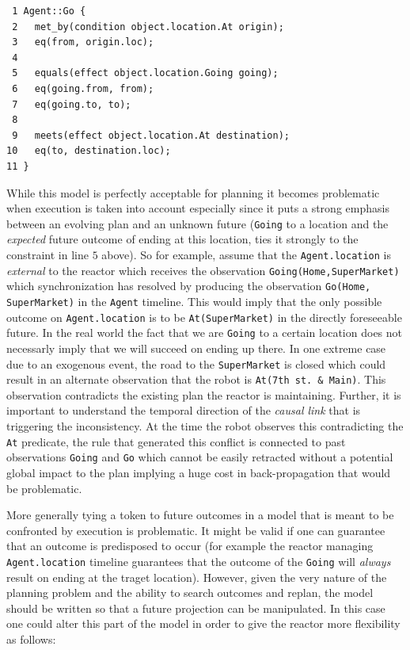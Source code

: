 \begin{verbatim}
 1 Agent::Go {
 2   met_by(condition object.location.At origin);
 3   eq(from, origin.loc);
 4
 5   equals(effect object.location.Going going);
 6   eq(going.from, from);
 7   eq(going.to, to);
 8   
 9   meets(effect object.location.At destination);
10   eq(to, destination.loc);
11 }
\end{verbatim}

While this model is perfectly acceptable for planning it becomes
problematic when execution is taken into account especially since it
puts a strong emphasis between an evolving plan and an unknown future
(\texttt{Going} to a location and the {\em expected} future outcome of
ending at this location, ties it strongly to the constraint in line
$5$ above).  So for example, assume that the \texttt{Agent.location}
is {\em external} to the reactor which receives the observation
\texttt{Going(Home,SuperMarket)} which synchronization has resolved by
producing the observation \texttt{Go(Home, SuperMarket)} in the
\texttt{Agent} timeline. This would imply that the only possible
outcome on \texttt{Agent.location} is to be \texttt{At(SuperMarket)}
in the directly foreseeable future. In the real world the fact that we
are \texttt{Going} to a certain location does not necessarly imply
that we will succeed on ending up there. In one extreme case due to an
exogenous event, the road to the \texttt{SuperMarket} is closed which
could result in an alternate observation that the robot is
\texttt{At(7th st. \& Main)}. This observation contradicts the
existing plan the reactor is maintaining. Further, it is important to
understand the temporal direction of the \emph{causal link} that is
triggering the inconsistency. At the time the robot observes this
contradicting the \texttt{At} predicate, the rule that generated this
conflict is connected to past observations \texttt{Going} and
\texttt{Go} which cannot be easily retracted without a potential
global impact to the plan implying a huge cost in back-propagation
that would be problematic.

More generally tying a token to future outcomes in a model that is
meant to be confronted by execution is problematic. It might be valid
if one can guarantee that an outcome is predisposed to occur (for
example the reactor managing \texttt{Agent.location} timeline
guarantees that the outcome of the \texttt{Going} will {\em always}
result on ending at the traget location). However, given the very
nature of the planning problem and the ability to search outcomes and
replan, the model should be written so that a future projection can be
manipulated. %
In this case one could alter this part of the model in order to give
the reactor more flexibility as follows:


